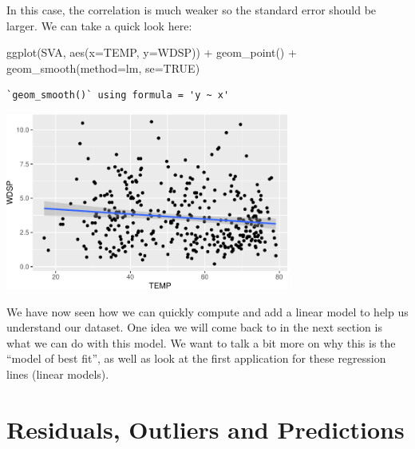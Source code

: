 \documentclass[
  letterpaper,
  DIV=11,
  numbers=noendperiod]{scrreprt}
\newenvironment{Shaded}{\begin{snugshade}}{\end{snugshade}}
\newcommand{\AttributeTok}[1]{\textcolor[rgb]{0.40,0.45,0.13}{#1}}
\newcommand{\ConstantTok}[1]{\textcolor[rgb]{0.56,0.35,0.01}{#1}}
\newcommand{\FunctionTok}[1]{\textcolor[rgb]{0.28,0.35,0.67}{#1}}
\newcommand{\NormalTok}[1]{\textcolor[rgb]{0.00,0.23,0.31}{#1}}
\newcommand{\SpecialCharTok}[1]{\textcolor[rgb]{0.37,0.37,0.37}{#1}}
\newcommand{\StringTok}[1]{\textcolor[rgb]{0.13,0.47,0.30}{#1}}
\begin{document}
In this case, the correlation is much weaker so the standard error
should be larger. We can take a quick look here:

\begin{Shaded}
\begin{Highlighting}[]
\FunctionTok{ggplot}\NormalTok{(SVA, }\FunctionTok{aes}\NormalTok{(}\AttributeTok{x=}\NormalTok{TEMP, }\AttributeTok{y=}\NormalTok{WDSP)) }\SpecialCharTok{+}
  \FunctionTok{geom\_point}\NormalTok{() }\SpecialCharTok{+}
  \FunctionTok{geom\_smooth}\NormalTok{(}\AttributeTok{method=}\StringTok{\textquotesingle{}lm\textquotesingle{}}\NormalTok{, }\AttributeTok{se=}\ConstantTok{TRUE}\NormalTok{)}
\end{Highlighting}
\end{Shaded}

\begin{verbatim}
`geom_smooth()` using formula = 'y ~ x'
\end{verbatim}

\begin{center}
\includegraphics[width=0.7\textwidth,height=\textheight]{Linear_Modeling_and_Regression_files/figure-pdf/unnamed-chunk-15-1.pdf}
\end{center}

We have now seen how we can quickly compute and add a linear model to
help us understand our dataset. One idea we will come back to in the
next section is what we can do with this model. We want to talk a bit
more on why this is the ``model of best fit'', as well as look at the
first application for these regression lines (linear models).


\chapter*{Residuals, Outliers and
Predictions}\label{residuals-outliers-and-predictions}
\end{document}
